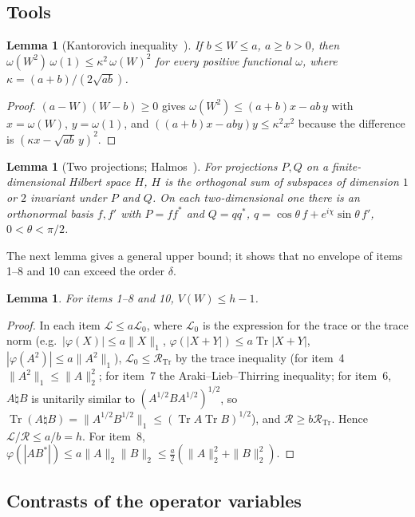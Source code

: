 \documentclass[11pt]{article}
\DeclareMathOperator{\Tr}{Tr}
\newcommand{\cL}{\mathcal{L}}
\newcommand{\cR}{\mathcal{R}}
\theoremstyle{plain}
\newtheorem{lemma}[theorem]{Lemma}
\theoremstyle{definition}
\theoremstyle{remark}
\begin{document}
\subsection{Tools}

\begin{lemma}[Kantorovich inequality~\cite{greub1959}]\label{lem:kant}
If $b\le W\le a$, $a\ge b>0$, then $\omega(W^2)\,\omega(1)\le\kappa^2\,\omega(W)^2$ for every positive functional
$\omega$, where $\kappa=(a+b)/(2\sqrt{ab})$.
\end{lemma}
\begin{proof}
$(a-W)(W-b)\ge0$ gives $\omega(W^2)\le(a+b)x-ab\,y$ with $x=\omega(W)$, $y=\omega(1)$, and $((a+b)x-aby)y\le\kappa^2x^2$
because the difference is $(\kappa x-\sqrt{ab}\,y)^2$.
\end{proof}

\begin{lemma}[Two projections; Halmos~\cite{halmos1969}]\label{lem:halmos}
For projections $P,Q$ on a finite-dimensional Hilbert space $H$, $H$ is the orthogonal sum of subspaces of dimension
$1$ or $2$ invariant under $P$ and $Q$. On each two-dimensional one there is an orthonormal basis $f,f'$ with $P=ff^*$
and $Q=qq^*$, $q=\cos\theta\,f+e^{i\chi}\sin\theta\,f'$, $0<\theta<\pi/2$.
\end{lemma}

The next lemma gives a general upper bound; it shows that no envelope of items 1--8 and 10 can exceed the order
$\delta$.

\begin{lemma}\label{lem:upper}
For items 1--8 and 10, $V(W)\le h-1$.
\end{lemma}
\begin{proof}
In each item $\cL\le a\cL_0$, where $\cL_0$ is the expression for the trace or the trace norm (e.g.\ $|\varphi(X)|\le a\|X\|_1$,
$\varphi(|X+Y|)\le a\Tr|X+Y|$, $|\varphi(A^2)|\le a\|A^2\|_1$), $\cL_0\le\cR_{\Tr}$ by the trace inequality (for item~4
$\|A^2\|_1\le\|A\|_2^2$; for item~7 the Araki--Lieb--Thirring inequality; for item~6, $A\natural B$ is unitarily similar to
$(A^{1/2}BA^{1/2})^{1/2}$, so $\Tr(A\natural B)=\|A^{1/2}B^{1/2}\|_1\le(\Tr A\Tr B)^{1/2}$), and $\cR\ge b\cR_{\Tr}$. Hence
$\cL/\cR\le a/b=h$. For item~8, $\varphi(|AB^*|)\le a\|A\|_2\|B\|_2\le\frac a2(\|A\|_2^2+\|B\|_2^2)$.
\end{proof}

\subsection{Contrasts of the operator variables}\label{sec:twocontrasts}
\end{document}

